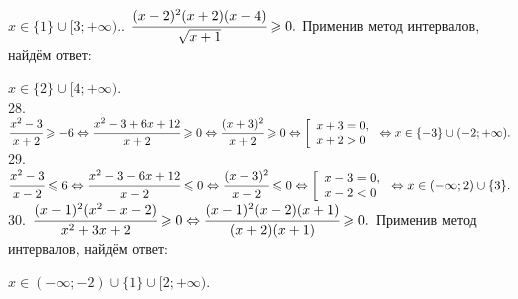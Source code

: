 \documentclass[12pt]{article}
\begin{document}
$x\in\{1\}\cup[3;+\infty).$\newpage{}. $\cfrac{(x-2)^2(x+2)(x-4)}{\sqrt{x+1}}\geqslant0.$
Применив метод интервалов, найдём ответ:
\begin{figure}[ht!]
\end{figure}
$x\in\{2\}\cup[4;+\infty).$\\
28. $\cfrac{x^2-3}{x+2}\geqslant-6\Leftrightarrow \cfrac{x^2-3+6x+12}{x+2}\geqslant0\Leftrightarrow \cfrac{(x+3)^2}{x+2}\geqslant0
\Leftrightarrow
\left[\begin{array}{l}
x+3=0,\\
x+2>0
\end{array}\right.\Leftrightarrow x \in \{-3\}\cup(-2;+\infty).$\\
29. $\cfrac{x^2-3}{x-2}\leqslant 6\Leftrightarrow \cfrac{x^2-3-6x+12}{x-2}\leqslant0\Leftrightarrow \cfrac{(x-3)^2}{x-2}\leqslant0
\Leftrightarrow
\left[\begin{array}{l}
x-3=0,\\
x-2<0
\end{array}\right.\Leftrightarrow x \in (-\infty;2)\cup\{3\}.$\\
30. $\cfrac{(x-1)^2(x^2-x-2)}{x^2+3x+2}\geqslant0\Leftrightarrow\cfrac{(x-1)^2(x-2)(x+1)}{(x+2)(x+1)}\geqslant0.$
Применив метод интервалов, найдём ответ:
\begin{figure}[ht!]
\end{figure}
$x\in(-\infty;-2)\cup\{1\}\cup[2;+\infty).$\\
\end{document}
